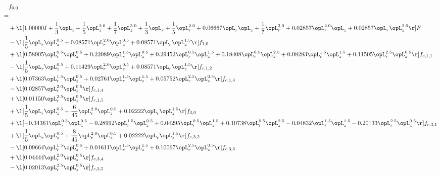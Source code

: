 \begin{alignat}{2} 
\label{eq:f_00_1} 
& f_{0,0} \nonumber \\ 
 = \\ 
& + \l[  1.00000 I + \frac{1}{3} \opL_z + \frac{1}{5} \opL_z^{2.0} + \frac{1}{7} \opL_z^{3.0} + \frac{1}{3} \opL_r + \frac{1}{5} \opL_r^{2.0} +  0.06667 \opL_r \opL_z + \frac{1}{7} \opL_r^{3.0} +  0.02857 \opL_r^{2.0} \opL_z +  0.02857 \opL_r \opL_z^{2.0}  \r] F \nonumber \\ 
& - \l[ \frac{1}{5} \opL_r \opL_z^{0.5} +  0.08571 \opL_r^{2.0} \opL_z^{0.5} +  0.08571 \opL_r \opL_z^{1.5}  \r] f_{1,0} \nonumber \\ 
& + \l[  0.58905 \opL_r^{0.5} \opL_z^{0.5} +  0.22089 \opL_r^{1.5} \opL_z^{0.5} +  0.29452 \opL_r^{0.5} \opL_z^{1.5} +  0.18408 \opL_r^{0.5} \opL_z^{2.5} +  0.08283 \opL_r^{1.5} \opL_z^{1.5} +  0.11505 \opL_r^{2.5} \opL_z^{0.5}  \r] f_{c,1,1} \nonumber \\ 
& - \l[ \frac{1}{5} \opL_r \opL_z^{0.5} +  0.11429 \opL_r^{2.0} \opL_z^{0.5} +  0.08571 \opL_r \opL_z^{1.5}  \r] f_{c,1,2} \nonumber \\ 
& + \l[  0.07363 \opL_r^{1.5} \opL_z^{0.5} +  0.02761 \opL_r^{1.5} \opL_z^{1.5} +  0.05752 \opL_r^{2.5} \opL_z^{0.5}  \r] f_{c,1,3} \nonumber \\ 
& - \l[  0.02857 \opL_r^{2.0} \opL_z^{0.5}  \r] f_{c,1,4} \nonumber \\ 
& + \l[  0.01150 \opL_r^{2.5} \opL_z^{0.5}  \r] f_{c,1,5} \nonumber \\ 
& + \l[ \frac{1}{5} \opL_r \opL_z^{0.5} + \frac{6}{45} \opL_r^{2.0} \opL_z^{0.5} +  0.02222 \opL_r \opL_z^{1.5}  \r] f_{3,0} \nonumber \\ 
& + \l[  -0.34361 \opL_r^{0.5} \opL_z^{0.5}   -0.28992 \opL_r^{1.5} \opL_z^{0.5} +  0.04295 \opL_r^{0.5} \opL_z^{1.5} +  0.10738 \opL_r^{0.5} \opL_z^{2.5}   -0.04832 \opL_r^{1.5} \opL_z^{1.5}   -0.20133 \opL_r^{2.5} \opL_z^{0.5}  \r] f_{c,3,1} \nonumber \\ 
& + \l[ \frac{1}{5} \opL_r \opL_z^{0.5} + \frac{8}{45} \opL_r^{2.0} \opL_z^{0.5} +  0.02222 \opL_r \opL_z^{1.5}  \r] f_{c,3,2} \nonumber \\ 
& - \l[  0.09664 \opL_r^{1.5} \opL_z^{0.5} +  0.01611 \opL_r^{1.5} \opL_z^{1.5} +  0.10067 \opL_r^{2.5} \opL_z^{0.5}  \r] f_{c,3,3} \nonumber \\ 
& + \l[  0.04444 \opL_r^{2.0} \opL_z^{0.5}  \r] f_{c,3,4} \nonumber \\ 
& - \l[  0.02013 \opL_r^{2.5} \opL_z^{0.5}  \r] f_{c,3,5} \nonumber \\ 

\end{alignat}
